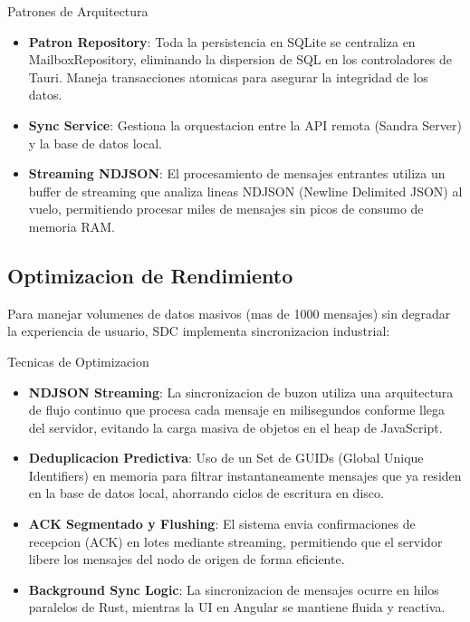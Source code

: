 \begin{caja}{Patrones de Arquitectura}
\begin{itemize}
\item \textbf{Patron Repository}: Toda la persistencia en SQLite se centraliza en MailboxRepository, eliminando la dispersion de SQL en los controladores de Tauri. Maneja transacciones atomicas para asegurar la integridad de los datos.

\item \textbf{Sync Service}: Gestiona la orquestacion entre la API remota (Sandra Server) y la base de datos local.

\item \textbf{Streaming NDJSON}: El procesamiento de mensajes entrantes utiliza un buffer de streaming que analiza lineas NDJSON (Newline Delimited JSON) al vuelo, permitiendo procesar miles de mensajes sin picos de consumo de memoria RAM.
\end{itemize}
\end{caja}


\subsection{Optimizacion de Rendimiento}

Para manejar volumenes de datos masivos (mas de 1000 mensajes) sin degradar la experiencia de usuario, SDC implementa sincronizacion industrial:

\begin{caja}{Tecnicas de Optimizacion}
\begin{itemize}
\item \textbf{NDJSON Streaming}: La sincronizacion de buzon utiliza una arquitectura de flujo continuo que procesa cada mensaje en milisegundos conforme llega del servidor, evitando la carga masiva de objetos en el heap de JavaScript.

\item \textbf{Deduplicacion Predictiva}: Uso de un Set de GUIDs (Global Unique Identifiers) en memoria para filtrar instantaneamente mensajes que ya residen en la base de datos local, ahorrando ciclos de escritura en disco.

\item \textbf{ACK Segmentado y Flushing}: El sistema envia confirmaciones de recepcion (ACK) en lotes mediante streaming, permitiendo que el servidor libere los mensajes del nodo de origen de forma eficiente.

\item \textbf{Background Sync Logic}: La sincronizacion de mensajes ocurre en hilos paralelos de Rust, mientras la UI en Angular se mantiene fluida y reactiva.
\end{itemize}
\end{caja}


